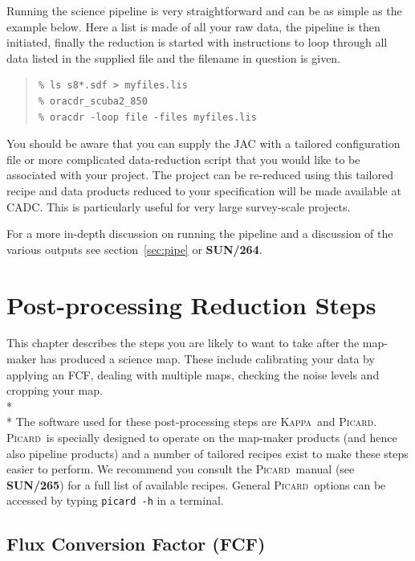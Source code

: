 \documentclass[twoside,11pt]{article}
\newcommand{\htmlref}[2]{#1}
\newcommand{\latexhtml}[2]{#1}
\newcommand{\xref}[3]{#1}
\newcommand{\xlabel}[1]{}
\renewcommand{\_}{\texttt{\symbol{95}}}
\newenvironment{myquote}{\begin{quote}\begin{small}}{\end{small}\end{quote}}
\newcommand{\Kappa}{\xref{\textsc{Kappa}}{sun95}{}}
\newcommand{\picard}{\xref{\textsc{Picard}}{sun265}{}}
\newcommand{\picardsun}{\xref{\textbf{SUN/265}}{sun265}{}}
\newcommand{\pipelinesun}{\xref{\textbf{SUN/264}}{sun264}{}}
\newcommand{\cref}[3]{\latexhtml{#1~\ref{#2}}{\htmlref{#3}{#2}}}
\begin{document}
Running the science pipeline is very straightforward and can be as
simple as the example below. Here a list is made of all your raw data,
the pipeline is then initiated, finally the reduction is started with
instructions to loop through all data listed in the supplied file and
the filename in question is given.

\begin{myquote}
\begin{verbatim}
% ls s8*.sdf > myfiles.lis
% oracdr_scuba2_850
% oracdr -loop file -files myfiles.lis
\end{verbatim}
\end{myquote}

You should be aware that you can supply the JAC with a tailored
configuration file or more complicated data-reduction script that you
would like to be associated with your project. The project can be
re-reduced using this tailored recipe and data products reduced to
your specification will be made available at CADC. This is
particularly useful for very large survey-scale projects.

For a more in-depth discussion on running the pipeline and a discussion
of the various outputs see \cref{section}{sec:pipe}{The SCUBA-2
Pipeline} or \pipelinesun.
\clearpage

\section{\xlabel{maps}Post-processing Reduction Steps}
\label{sec:postprocess}

This chapter describes the steps you are likely to want to take after
the map-maker has produced a science map. These include calibrating
your data by applying an FCF, dealing with multiple maps, checking the
noise levels and cropping your map.
\\*\\*
The software used for these post-processing steps are \Kappa\ and
\picard. \picard\ is specially designed to operate on the map-maker
products (and hence also pipeline products) and a number of tailored
recipes exist to make these steps easier to perform. We recommend you
consult the \picard\ manual (see \picardsun) for a full list of
available recipes. General \picard\ options can be accessed by typing
\texttt{picard -h} in a terminal.

\subsection{\xlabel{apply_fcf}Flux Conversion Factor (FCF)}
\label{sec:cmult}
\end{document}
